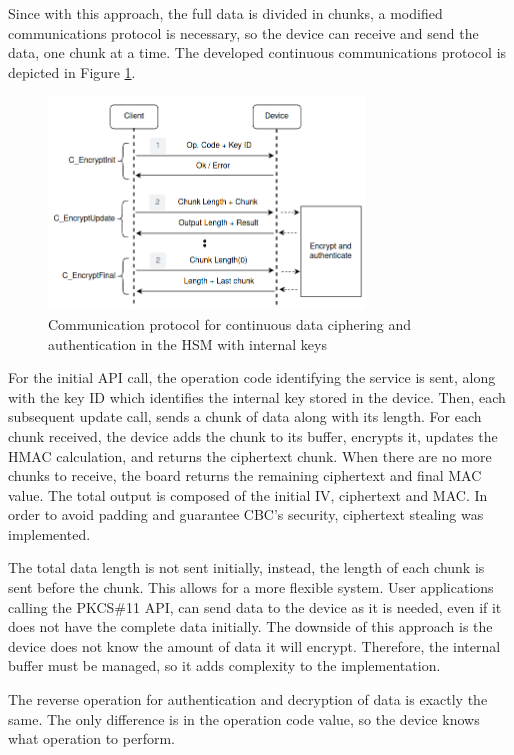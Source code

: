 Since with this approach, the full data is divided in chunks, a modified communications protocol is necessary, so the device can receive and send the data, one chunk at a time.  The developed continuous communications protocol is depicted in Figure \ref{fig:protocol:data-exchange-chunks}.
\begin{figure}[h!]
	\centering
	\includegraphics[width=0.75\textwidth]{./Images/data-exchange-chunks.png}
	\caption{Communication protocol for continuous data ciphering and authentication in the HSM with internal keys}
	\label{fig:protocol:data-exchange-chunks}
\end{figure}
For the initial API call, the operation code identifying the service is sent, along with the key ID which identifies the internal key stored in the device.
Then, each subsequent update call, sends a chunk of data along with its length.
For each chunk received, the device adds the chunk to its buffer, encrypts it, updates the HMAC calculation, and returns the ciphertext chunk.
When there are no more chunks to receive, the board returns the remaining ciphertext and final MAC value. The total output is composed of the initial IV, ciphertext and MAC.
In order to avoid padding and guarantee CBC's security, ciphertext stealing was implemented.

The total data length is not sent initially, instead, the length of each chunk is sent before the chunk. This allows for a more flexible system. User applications calling the PKCS\#11 API, can send data to the device as it is needed, even if it does not have the complete data initially.
The downside of this approach is the device does not know the amount of data it will encrypt. Therefore, the internal buffer must be managed, so it adds complexity to the implementation.

The reverse operation for authentication and decryption of data is exactly the same. The only difference is in the operation code value, so the device knows what operation to perform.

